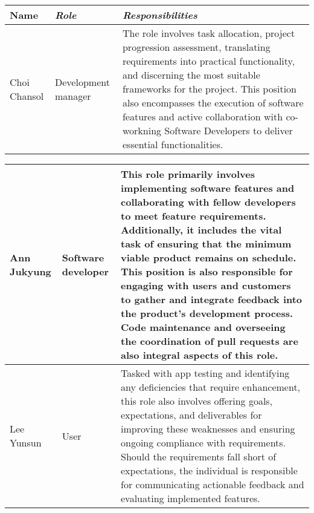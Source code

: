 \documentclass[conference]{IEEEtran}
\begin{document}
\begin{table}[!htbp]\normalsize
\begin{center}
\begin{tabular}{|p{1.2cm}|p{1.9cm}|p{4.5cm}|}
\hline
\textbf{Name} & \textbf{\textit{Role}}& \textbf{\textit{Responsibilities}}\\
\hline
Choi Chansol & Development manager &
The role involves task allocation, project progression assessment, translating requirements into practical functionality, and discerning the most suitable frameworks for the project.\newline 
\newline This position also encompasses the execution of software features and active collaboration with co-workning Software Developers to deliver essential functionalities.
\\ \hline
\end{tabular}
\label{tab1}
\end{center}
\end{table}
\newpage
\begin{table}[!htbp]\normalsize
\begin{center}
\begin{tabular}{|p{1.2cm}|p{1.9cm}|p{4.5cm}|}
\hline
Ann Jukyung & Software developer &
This role primarily involves implementing software features and collaborating with fellow developers to meet feature requirements. Additionally, it includes the vital task of ensuring that the minimum viable product remains on schedule. \newline
\newline This position is also responsible for engaging with users and customers to gather and integrate feedback into the product's development process. Code maintenance and overseeing the coordination of pull requests are also integral aspects of this role.
\\ \hline
Lee Yunsun & User &
Tasked with app testing and identifying any deficiencies that require enhancement, this role also involves offering goals, expectations, and deliverables for improving these weaknesses and ensuring ongoing compliance with requirements. \newline 
\newline Should the requirements fall short of expectations, the individual is responsible for communicating actionable feedback and evaluating implemented features.
\\ \hline
\end{tabular}
\label{tab2}
\end{center}
\end{table}
\end{document}
